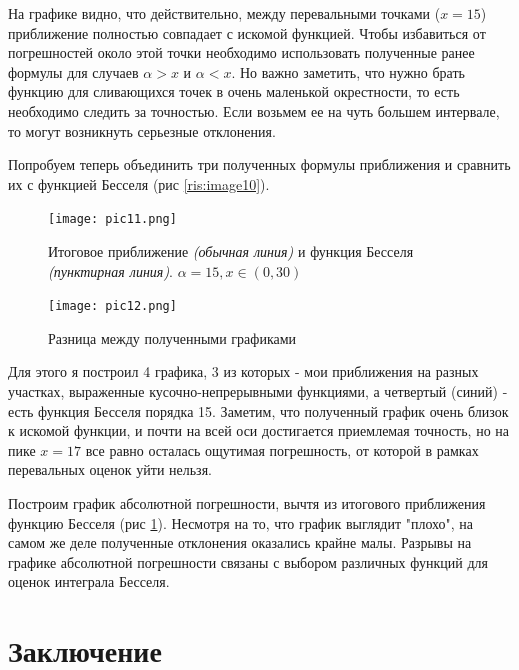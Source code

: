 \documentclass[14pt]{extarticle}
\begin{document}
На графике видно, что действительно, между перевальными точками ($x=15$) приближение полностью совпадает с искомой функцией. Чтобы избавиться от погрешностей около этой точки необходимо использовать полученные ранее формулы для случаев $\alpha>x$ и $\alpha<x$.  Но важно заметить, что нужно брать функцию для сливающихся точек в очень маленькой окрестности, то есть необходимо следить за точностью. Если возьмем ее на чуть большем интервале, то могут возникнуть серьезные отклонения.

Попробуем теперь объединить три полученных формулы приближения и сравнить их с функцией Бесселя (рис \ref{ris:image10}). 
  

\begin{figure}[h]
	\begin{center}
		\begin{minipage}[h]{0.45\linewidth}
			\texttt{[image: pic11.png]}
			\caption{Итоговое приближение \textit{(обычная линия)} и функция Бесселя \textit{(пунктирная линия)}. $\alpha=15, x \in (0, 30)$} %
			\label{ris:image10} %
		\end{minipage}
		\hfill 
		\begin{minipage}[h]{0.45\linewidth}
			\texttt{[image: pic12.png]}
			\caption{Разница между полученными графиками}
			\label{ris:image12}
		\end{minipage}
	\end{center}
\end{figure}


Для этого я построил 4 графика, 3 из которых - мои приближения на разных участках, выраженные кусочно-непрерывными функциями, а четвертый (синий) - есть функция Бесселя порядка 15. Заметим, что полученный график очень близок к искомой функции, и почти на всей оси достигается приемлемая точность, но на пике $x=17$ все равно осталась ощутимая погрешность, от которой в рамках перевальных оценок уйти нельзя. 

Построим график абсолютной погрешности, вычтя из итогового приближения функцию Бесселя (рис \ref{ris:image12}). Несмотря на то, что график выглядит "плохо", на самом же деле полученные отклонения оказались крайне малы. Разрывы на графике абсолютной погрешности связаны с выбором различных функций для оценок интеграла Бесселя.

\newpage
\section*{Заключение}
  
\end{document}
